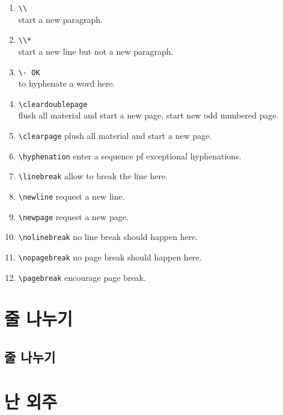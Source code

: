 		\begin{enumerate}[ topsep=0.0em, itemsep=-0.5em ]
		\item	\verb|\\| \\
				start a new paragraph.
		\item	\verb|\\*| \\
				 start a new line but not a new paragraph.
		\item	\verb|\- OK| \\
				to hyphenate a word here.
		\item	\verb|\cleardoublepage| \\
				flush all material and start a new page, start new odd numbered page.
		\item	\verb|\clearpage| plush all material and start a new page.
		\item	\verb|\hyphenation| enter a sequence pf exceptional hyphenations.
		\item	\verb|\linebreak| allow to break the line here.
		\item	\verb|\newline| request a new line.
		\item	\verb|\newpage| request a new page.
		\item	\verb|\nolinebreak| no line break should happen here.
		\item	\verb|\nopagebreak| no page break should happen here.
		\item	\verb|\pagebreak| encourage page break.
		\end{enumerate}
	
	



\newpage
\chapter{줄 나누기}
		
	\newpage
	\section{줄 나누기}
	

\newpage
\chapter{난 외주}

